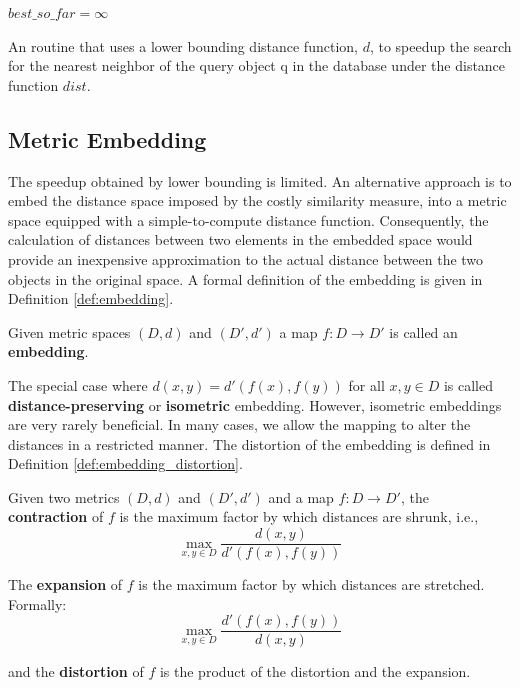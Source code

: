 \begin{algorithm}
$best\_so\_far = \infty$\;
\caption{An routine that uses a lower bounding distance function, $d$, to speedup the search for the nearest neighbor of the query object q in the database under the distance function $dist$.}
\label{alg:lower_bound}
\end{algorithm}

\subsection{Metric Embedding}
\label{subsec:metric_embedding}

\iftoggle{edit-mode}{\hspace{0pt}\marginpar{A different approach}}{}
The speedup obtained by lower bounding is limited. An alternative approach is to embed the distance space imposed by the costly similarity measure, into a metric space equipped with a simple-to-compute distance function. Consequently, the calculation of distances between two elements in the embedded space would provide an inexpensive approximation to the actual distance between the two objects in the original space. A formal definition of the embedding is given in Definition \ref{def:embedding}.

\begin{definition}
Given metric spaces $(D, d)$ and $(D', d')$ a map $f : D \rightarrow D'$ is called an \textbf{embedding}.
\label{def:embedding}
\end{definition}

\iftoggle{edit-mode}{\hspace{0pt}\marginpar{Isometric embedding}}{}
The special case where $d(x, y) = d'(f(x), f(y))$ for all $x, y \in D$ is called \textbf{distance-preserving} or \textbf{isometric} embedding. However, isometric embeddings are very rarely beneficial. In many cases, we allow the mapping to alter the distances in a restricted manner. The distortion of the embedding is defined in Definition \ref{def:embedding_distortion}.

\begin{definition}
Given two metrics $(D, d)$ and $(D',d')$ and a map $f : D \rightarrow D'$, the \textbf{contraction} of $f$ is the maximum factor by which distances are shrunk, i.e.,
\begin{equation}
\max_{x,y \in D} \frac{d(x,y)}{d'(f(x),f(y))}
\end{equation}

The \textbf{expansion} of $f$ is the maximum factor by which distances are stretched. Formally:
\begin{equation}
\max_{x,y \in D} \frac{d'(f(x),f(y))}{d(x,y)}
\end{equation}

and the \textbf{distortion} of $f$ is the product of the distortion and the expansion.
\label{def:embedding_distortion}
\end{definition}

